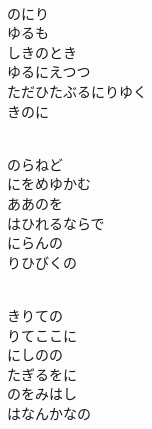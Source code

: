 \documentclass[10pt,b5j]{tarticle} %
\begin{document}
\begin{enumerate}
\begin{minipage}[c]{\blocksize}
    \end{minipage}
    \begin{minipage}[c]{\blocksize}
        
        \vspace{\linespace}
        \item~\\
        のにり\\
        ゆるも\\
        しきのとき\\
        ゆるにえつつ\\
        ただひたぶるにりゆく\\
        きのに
        
    \end{minipage}
    \begin{minipage}[c]{\blocksize}
        
        \vspace{\linespace}
        \item~\\
        のらねど\\
        にをめゆかむ\\
        ああのを\\
        はひれるならで\\
        にらんの\\
        りひびくの
        
    \end{minipage}
    \begin{minipage}[c]{\blocksize}
        
        \vspace{\linespace}
        \item~\\
        きりての\\
        りてここに\\
        にしのの\\
        たぎるをに\\
        のをみはし\\
        はなんかなの
        

\end{minipage}
\end{enumerate}
\end{document}
